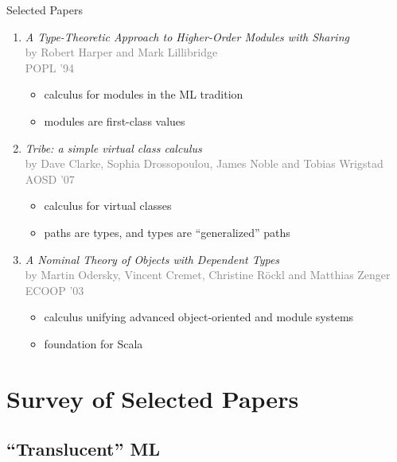 \documentclass{beamer}
\begin{document}
\begin{frame}{Selected Papers}
\begin{enumerate}
\item {\it A Type-Theoretic Approach to Higher-Order
  Modules with Sharing}\\{\footnotesize\textcolor{gray}{by Robert Harper and Mark
  Lillibridge\\POPL '94}}\begin{itemize}
\item calculus for modules in the ML tradition
\item modules are first-class values
\end{itemize}
\item {\it Tribe: a simple virtual class calculus}\\
  {\footnotesize\textcolor{gray}{by Dave Clarke, Sophia Drossopoulou, James Noble and Tobias Wrigstad\\AOSD '07}}\begin{itemize}
\item calculus for virtual classes
\item paths are types, and types are ``generalized'' paths
\end{itemize}
\item {\it A Nominal Theory of Objects with Dependent
  Types}\\{\footnotesize\textcolor{gray}{by Martin Odersky, Vincent Cremet, Christine R{\"o}ckl and
  Matthias Zenger\\ECOOP '03}}\begin{itemize}
\item calculus unifying advanced object-oriented and module systems
\item foundation for Scala
\end{itemize}
\end{enumerate}
\end{frame}

\section{Survey of Selected Papers}

\subsection{``Translucent'' ML}
\end{document}
